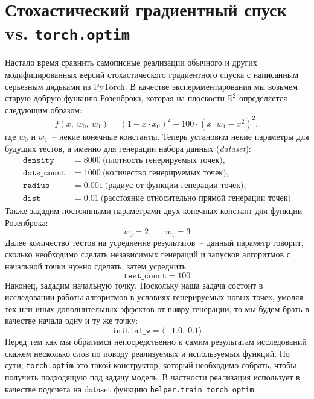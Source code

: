 \documentclass[12pt, a4paper, oneside, final]{article}
\begin{document}
	\section*{Стохастический градиентный спуск vs. \texttt{torch.optim}}
	Настало время сравнить самописные реализации обычного и других модифицированных версий стохастического градиентного спуска с написанным серьезным дядьками из PyTorch.
	В качестве экспериментирования мы возьмем старую добрую функцию Розенброка, которая на плоскости $\mathbb{R}^2$ определяется следующим образом:
	\[
		f(x, ~ w_0, ~ w_1) = (1 - x \cdot x_0)^2 + 100 \cdot (x \cdot w_1 - x^2)^2,
	\] где $w_0$ и $w_1$~-- некие конечные константы.
	Теперь установим некие параметры для будущих тестов, а именно для генерации набора данных (\textit{dataset}):
	\begin{align*}
		\mathit{\mathtt{density}} &= 8000~\text{(плотность генерируемых точек)}, \\
		\mathit{\mathtt{dots\_count}} &= 1000~\text{(количество генерируемых точек)}, \\
		\mathit{\mathtt{radius}} &= 0.001~\text{(радиус от функции генерации точек)}, \\
		\mathit{\mathtt{dist}} &= 0.01~\text{(расстояние относительно прямой генерации точек)}
	\end{align*}
	Также зададим постоянными параметрами двух конечных констант для функции Розенброка:
	\[
		w_0 = 2 \qquad w_1 = 3
	\]
	Далее количество тестов на усреднение результатов~-- данный параметр говорит, сколько необходимо сделать независимых генераций и запусков алгоритмов с начальной точки нужно сделать, затем усреднить:
	\[
		\mathit{\mathtt{test\_count}} = 100
	\]
	Наконец, зададим начальную точку.
	Поскольку наша задача состоит в исследовании работы алгоритмов в условиях генерируемых новых точек, умоляя тех или иных дополнительных эффектов от \texttt{numpy}-генерации, то мы будем брать в качестве начала одну и ту же точку:
	\[
		\mathit{\mathtt{initial\_w}} = \langle -1.0, ~ 0.1\rangle
	\]
	Перед тем как мы обратимся непосредственно к самим результатам исследований скажем несколько слов по поводу реализуемых и используемых функций.
	По сути, \texttt{torch.optim} это такой конструктор, который необходимо собрать, чтобы получить подходящую под задачу модель.
	В частности реализация использует в качестве подсчета на dataset функцию \texttt{helper.train\_torch\_optim}:
\end{document}
